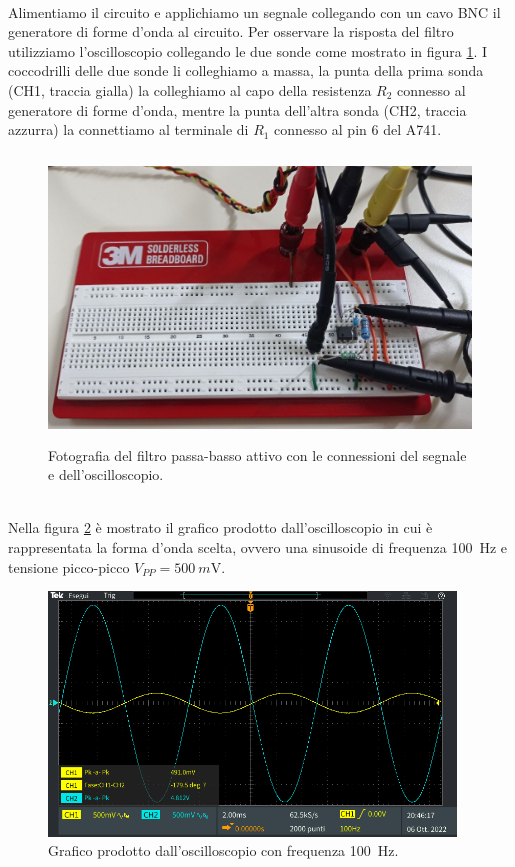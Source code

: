 \documentclass{report}
\begin{document}
\\Alimentiamo il circuito e applichiamo un segnale collegando con un cavo BNC il generatore di forme d'onda al circuito. Per osservare la risposta del filtro utilizziamo l'oscilloscopio collegando le due sonde come mostrato in figura \ref{figura:connessioni}. I coccodrilli delle due sonde li colleghiamo a massa, la punta della prima sonda (CH1, traccia gialla) la colleghiamo al capo della resistenza $R_2$ connesso al generatore di forme d'onda, mentre la punta dell'altra sonda (CH2, traccia azzurra) la connettiamo al terminale di $R_1$ connesso al pin 6 del \textmu A741.
\begin{figure}[h!]
\centering
\includegraphics[height=7.6cm]{immagini/circuito_sonde}
\caption{Fotografia del filtro passa-basso attivo con le connessioni del segnale e dell'oscilloscopio.}
\label{figura:connessioni}
\end{figure}
\\Nella figura \ref{figura:TEK1} è mostrato il grafico prodotto dall'oscilloscopio in cui è rappresentata la forma d'onda scelta, ovvero una sinusoide di frequenza \SI{100}{\hertz} e tensione picco-picco $V_{PP}=\SI{500}{m\volt}$.
\begin{figure}[h!]
	\centering
	\includegraphics[height=6.5cm]{immagini/TEK00001}
	\caption{Grafico prodotto dall'oscilloscopio con frequenza \SI{100}{\hertz}.}
	\label{figura:TEK1}
\end{figure}
\end{document}
